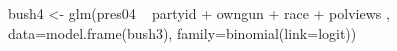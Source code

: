 \begin{Schunk}
\begin{Sinput}
  bush4 <- glm(pres04 ~ partyid +  owngun + race + polviews , data=model.frame(bush3), family=binomial(link=logit))
\end{Sinput}
\end{Schunk}
